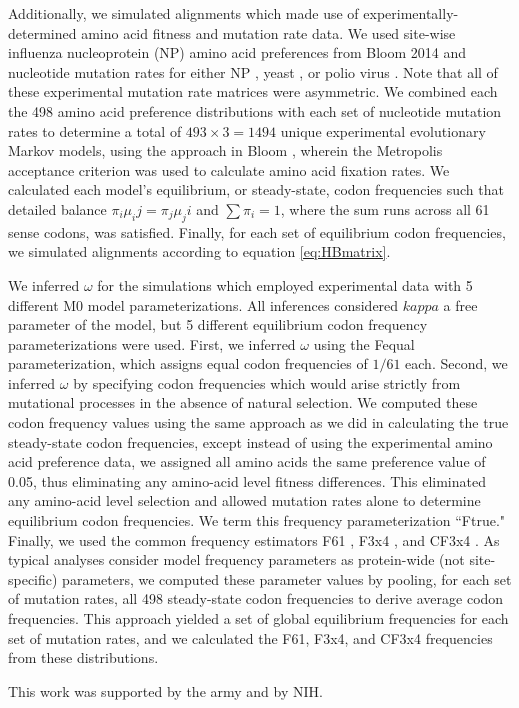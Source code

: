 \documentclass{pnastwo}
\begin{document}
\begin{article}
Additionally, we simulated alignments which made use of experimentally-determined amino acid fitness and mutation rate data. We used site-wise influenza nucleoprotein (NP) amino acid preferences from Bloom 2014 \cite{Bloom2014a} and nucleotide mutation rates for either NP \cite{Bloom2014a}, yeast \cite{Zhu2014}, or polio virus \cite{Acevedo2014}. Note that all of these experimental mutation rate matrices were asymmetric. We combined each the 498 amino acid preference distributions with each set of nucleotide mutation rates to determine a total of $493 \times 3 = 1494$ unique experimental evolutionary Markov models, using the approach in Bloom \cite{Bloom2014a}, wherein the Metropolis acceptance criterion \cite{Metropolis1953} was used to calculate amino acid fixation rates. We calculated each model's equilibrium, or steady-state, codon frequencies such that detailed balance $\pi_i\mu_ij = \pi_j\mu_ji$ and $\sum\pi_i = 1$, where the sum runs across all 61 sense codons, was satisfied. Finally, for each set of equilibrium codon frequencies, we simulated alignments according to equation \eqref{eq:HBmatrix}.

We inferred $\omega$ for the simulations which employed experimental data with 5 different M0 model parameterizations. All inferences considered $kappa$ a free parameter of the model, but 5 different equilibrium codon frequency parameterizations were used. First, we inferred $\omega$ using the Fequal \cite{Yang2006} parameterization, which assigns equal codon frequencies of $1/61$ each. Second, we inferred $\omega$ by specifying codon frequencies which would arise strictly from mutational processes in the absence of natural selection. We computed these codon frequency values using the same approach as we did in calculating the true steady-state codon frequencies, except instead of using the experimental amino acid preference data, we assigned all amino acids the same preference value of 0.05, thus eliminating any amino-acid level fitness differences. This eliminated any amino-acid level selection and allowed mutation rates alone to determine equilibrium codon frequencies. We term this frequency parameterization ``Ftrue." Finally, we used the common frequency estimators F61 \cite{GoldmanYang1994}, F3x4 \cite{MuseGaut1994}, and CF3x4 \cite{Pond2010}. As typical analyses consider model frequency parameters as protein-wide (not site-specific) parameters, we computed these parameter values by pooling, for each set of mutation rates, all 498 steady-state codon frequencies to derive average codon frequencies. This approach yielded a set of global equilibrium frequencies for each set of mutation rates, and we calculated the F61, F3x4, and CF3x4 frequencies from these distributions.


\begin{acknowledgments}
This work was supported by the army and by NIH.
\end{acknowledgments}







\end{article}
\clearpage
\newpage	
\end{document}
